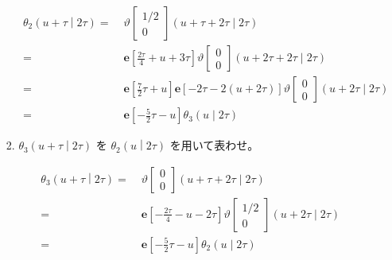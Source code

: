 \documentclass[12pt,b5paper]{ltjsarticle}
\begin{document}
\begin{enumerate}
\begin{enumerate}
\begin{enumerate}
                    \begin{align}
                     \theta_{2} \left(u+\tau \middle| 2\tau \right)
                     =&\;
                     \vartheta \begin{bmatrix} 1/2 \\ 0 \end{bmatrix} (u+\tau+2\tau \mid 2\tau)\\
                     =&\;
                     \mathbf{e}[\frac{2\tau}{4}+u+3\tau]
                     \vartheta \begin{bmatrix} 0 \\ 0 \end{bmatrix} (u+2\tau+2\tau \mid 2\tau)\\
                     =&\;
                     \mathbf{e}[\frac{7}{2}\tau+u]
                     \mathbf{e}[-2\tau -2(u+2\tau)]
                     \vartheta \begin{bmatrix} 0 \\ 0 \end{bmatrix} (u+2\tau \mid 2\tau)\\
                     =&\;
                     \mathbf{e}[-\frac{5}{2}\tau-u]
                     \theta_{3} \left(u \mid 2\tau \right)
                    \end{align}

                    \hrulefill

              \item $\displaystyle \theta_{3} \left(u+\tau \middle| 2\tau \right)$
                    を
                    $\displaystyle \theta_{2} \left(u \middle| 2\tau \right)$
                    を用いて表わせ。

                    \dotfill

                    \begin{align}
                     \theta_{3} \left(u+\tau \middle| 2\tau \right)
                     =&\;
                     \vartheta \begin{bmatrix} 0 \\ 0 \end{bmatrix} (u+\tau+2\tau \mid 2\tau)\\
                     =&\;
                     \mathbf{e}[-\frac{2\tau}{4} -u-2\tau]
                     \vartheta \begin{bmatrix} 1/2 \\ 0 \end{bmatrix} (u+2\tau \mid 2\tau)\\
                     =&\;
                     \mathbf{e}[-\frac{5}{2}\tau-u]
                     \theta_{2} \left(u \mid 2\tau \right)
                    \end{align}


\end{enumerate}
\end{enumerate}
\end{enumerate}
\end{document}
